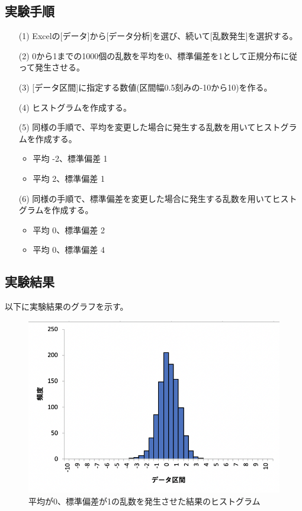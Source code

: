 \documentclass[12pt]{jarticle}
\begin{document}
\subsection{実験手順}
\begin{itemize}
    \item[(1)] Excelの[データ]から[データ分析]を選び、続いて[乱数発生]を選択する。
    \item[(2)] 0から1までの1000個の乱数を平均を0、標準偏差を1として正規分布に従って発生させる。
    \item[(3)] [データ区間]に指定する数値(区間幅0.5刻みの-10から10)を作る。
    \item[(4)] ヒストグラムを作成する。
    \item[(5)] 同様の手順で、平均を変更した場合に発生する乱数を用いてヒストグラムを作成する。
          \begin{itemize}
              \item 平均 -2、標準偏差 1
              \item 平均 2、標準偏差 1
          \end{itemize}
    \item[(6)] 同様の手順で、標準偏差を変更した場合に発生する乱数を用いてヒストグラムを作成する。
          \begin{itemize}
              \item 平均 0、標準偏差 2
              \item 平均 0、標準偏差 4
          \end{itemize}
\end{itemize}

\subsection{実験結果}
以下に実験結果のグラフを示す。

\begin{figure}[h]
    \begin{center}
        \includegraphics[scale=0.6]{kadai4_3graph1.png}
    \end{center}
    \caption{平均が0、標準偏差が1の乱数を発生させた結果のヒストグラム}
\end{figure}
\end{document}
